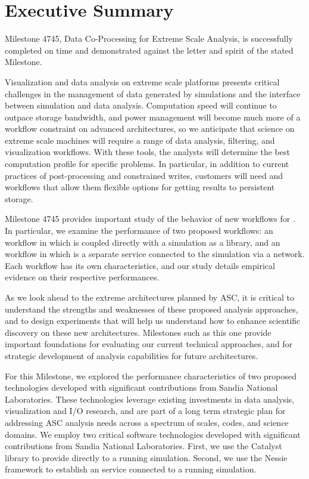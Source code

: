 \section*{Executive Summary}

Milestone 4745, Data Co-Processing for Extreme Scale Analysis, is
successfully completed on time and demonstrated against the letter and
spirit of the stated Milestone.

Visualization and data analysis on extreme scale platforms presents
critical challenges in the management of data generated by simulations and
the interface between simulation and data analysis.  Computation speed will
continue to outpace storage bandwidth, and power management will become
much more of a workflow constraint on advanced architectures, so we
anticipate that science on extreme scale machines will require a range of
data analysis, filtering, and visualization workflows.  With these tools, the
analysts will determine 
the best computation profile for specific problems.  In particular, in 
addition to current
practices of post-processing and constrained writes, customers will need
\insitu and \intransit workflows that allow them flexible options for
getting results to persistent storage.

Milestone 4745 provides important study of the behavior of new workflows
for \vda.  In particular, we examine the performance of two proposed
workflows: an \insitu workflow in which \vda is coupled directly with a
simulation as a library, and an \intransit workflow in which \vda is a separate
service connected to the simulation via a network.  Each workflow has its
own characteristics, and our study details empirical evidence on their
respective performances.

As we look ahead to the extreme architectures planned by ASC, it is critical to
understand the strengths and weaknesses of these proposed analysis approaches,
and to design experiments that will help us understand how to enhance
scientific discovery on these new architectures.  Milestones such as this one
provide important foundations for evaluating our current technical approaches,
and for strategic development of analysis capabilities for future
architectures.

For this Milestone, we explored the performance characteristics of two proposed
technologies developed with significant contributions from Sandia National
Laboratories.  These technologies leverage existing investments in data
analysis, visualization and I/O research, and are part of a long term strategic
plan for addressing ASC analysis needs across a spectrum of scales, codes, and
science domains.  We employ two critical software technologies developed with
significant contributions from Sandia National Laboratories.  First, we use the
Catalyst library to provide \insitu \vda directly to a running simulation.
Second, we use the Nessie framework to establish an \intransit \vda service
connected to a running simulation.

